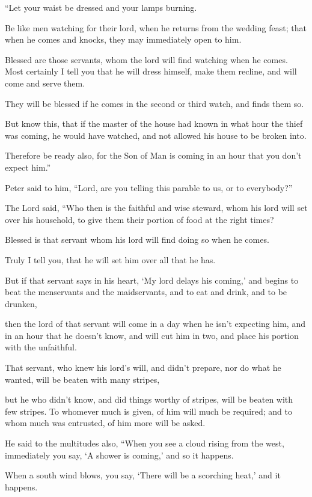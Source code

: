 “Let your waist be dressed and your lamps burning.

Be like men watching for their lord, when he returns from the wedding feast; that when he comes and knocks, they may immediately open to him.

Blessed are those servants, whom the lord will find watching when he comes. Most certainly I tell you that he will dress himself, make them recline, and will come and serve them.

They will be blessed if he comes in the second or third watch, and finds them so.

But know this, that if the master of the house had known in what hour the thief was coming, he would have watched, and not allowed his house to be broken into.

Therefore be ready also, for the Son of Man is coming in an hour that you don’t expect him.”

Peter said to him, “Lord, are you telling this parable to us, or to everybody?”

The Lord said, “Who then is the faithful and wise steward, whom his lord will set over his household, to give them their portion of food at the right times?

Blessed is that servant whom his lord will find doing so when he comes.

Truly I tell you, that he will set him over all that he has.

But if that servant says in his heart, ‘My lord delays his coming,’ and begins to beat the menservants and the maidservants, and to eat and drink, and to be drunken,

then the lord of that servant will come in a day when he isn’t expecting him, and in an hour that he doesn’t know, and will cut him in two, and place his portion with the unfaithful.

That servant, who knew his lord’s will, and didn’t prepare, nor do what he wanted, will be beaten with many stripes,

but he who didn’t know, and did things worthy of stripes, will be beaten with few stripes. To whomever much is given, of him will much be required; and to whom much was entrusted, of him more will be asked.

He said to the multitudes also, “When you see a cloud rising from the west, immediately you say, ‘A shower is coming,’ and so it happens.

When a south wind blows, you say, ‘There will be a scorching heat,’ and it happens.

